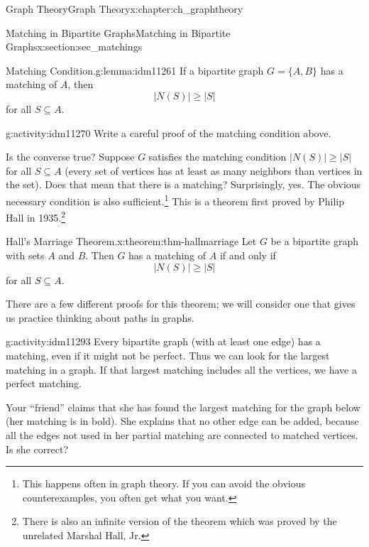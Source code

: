 \documentclass[oneside,10pt,]{book}
\numberwithin{equation}{chapter}
\begin{document}
\begin{chapterptx}{Graph Theory}{}{Graph Theory}{}{}{x:chapter:ch_graphtheory}
\begin{sectionptx}{Matching in Bipartite Graphs}{}{Matching in Bipartite Graphs}{}{}{x:section:sec_matchings}
\begin{lemma}{Matching Condition.}{}{g:lemma:idm11261}%
 If a bipartite graph \(G = \{A, B\}\) has a matching of \(A\), then%
\begin{equation*}
|N(S)| \ge |S|
\end{equation*}
for all \(S \subseteq A\).%
\end{lemma}
\begin{activity}{}{g:activity:idm11270}%
Write a careful proof of the matching condition above.%
\end{activity}
Is the converse true? Suppose \(G\) satisfies the matching condition \(|N(S)| \ge |S|\) for all \(S \subseteq A\) (every set of vertices has at least as many neighbors than vertices in the set). Does that mean that there is a matching? Surprisingly, yes. The obvious necessary condition is also sufficient.\footnote{This happens often in graph theory.  If you can avoid the obvious counterexamples, you often get what you want.\label{g:fn:idm11277}} This is a theorem first proved by Philip Hall in 1935.\footnote{There is also an infinite version of the theorem which was proved by the unrelated Marshal Hall, Jr.\label{g:fn:idm11278}}%
\begin{theorem}{Hall's Marriage Theorem.}{}{x:theorem:thm-hallmarriage}%
 Let \(G\) be a bipartite graph with sets \(A\) and \(B\). Then \(G\) has a matching of \(A\) if and only if%
\begin{equation*}
|N(S)| \ge |S|
\end{equation*}
for all \(S \subseteq A\).%
\end{theorem}
There are a few different proofs for this theorem; we will consider one that gives us practice thinking about paths in graphs.%
\begin{activity}{}{g:activity:idm11293}%
Every bipartite graph (with at least one edge) has a matching, even if it might not be perfect.  Thus we can look for the largest matching in a graph.  If that largest matching includes all the vertices, we have a perfect matching.%
\par
Your ``friend'' claims that she has found the largest matching for the graph below (her matching is in bold). She explains that no other edge can be added, because all the edges not used in her partial matching are connected to matched vertices. Is she correct?%
\begin{sidebyside}{1}{0.3}{0.3}{0}%
\begin{sbspanel}{0.4}%
\resizebox{\linewidth}{!}{%
}
\end{sbspanel}
\end{sidebyside}
\end{activity}
\end{sectionptx}
\end{chapterptx}
\end{document}
